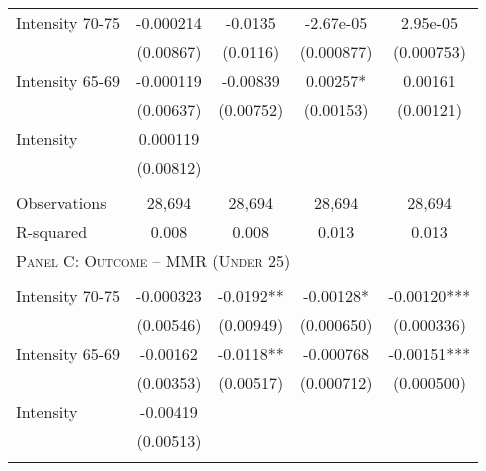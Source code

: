 \begin{subtables}
\begin{table}[htpb!]
\begin{center}
\begin{tabular}{p{5cm}cccc}
Intensity 70-75&-0.000214&-0.0135&-2.67e-05&2.95e-05\\ 
               &(0.00867)&(0.0116)&(0.000877)&(0.000753)\\ 
Intensity 65-69&-0.000119&-0.00839&0.00257*&0.00161\\ 
               &(0.00637)&(0.00752)&(0.00153)&(0.00121)\\ 
Intensity      &0.000119&&&\\ 
               &(0.00812)&&&\\ 
\begin{footnotesize}\end{footnotesize}&\begin{footnotesize}\end{footnotesize}&\begin{footnotesize}\end{footnotesize}&\begin{footnotesize}\end{footnotesize}\\ 
Observations&28,694&28,694&28,694&28,694\\ 
R-squared&0.008&0.008&0.013&0.013\\ \midrule 
\multicolumn{5}{l}{\textsc{Panel C: Outcome -- MMR (Under 25)}}\\ 
\begin{footnotesize}\end{footnotesize}&\begin{footnotesize}\end{footnotesize}&\begin{footnotesize}\end{footnotesize}&\begin{footnotesize}\end{footnotesize}\\ 
Intensity 70-75&-0.000323&-0.0192**&-0.00128*&-0.00120***\\ 
               &(0.00546)&(0.00949)&(0.000650)&(0.000336)\\ 
Intensity 65-69&-0.00162&-0.0118**&-0.000768&-0.00151***\\ 
               &(0.00353)&(0.00517)&(0.000712)&(0.000500)\\ 
Intensity      &-0.00419&&&\\ 
               &(0.00513)&&&\\ 
\begin{footnotesize}\end{footnotesize}&\begin{footnotesize}\end{footnotesize}&\begin{footnotesize}\end{footnotesize}&\begin{footnotesize}\end{footnotesize}\\ 

\end{tabular}
\end{center}
\end{table}
\end{subtables}
